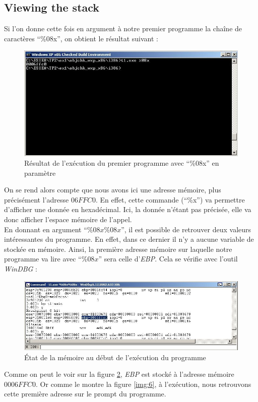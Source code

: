 \subsection{Viewing the stack}\label{stack}
Si l'on donne cette fois en argument à notre premier programme la chaîne de caractères \enquote{\%08x}, on obtient le résultat suivant :
\begin{figure}[H]
  \centering
  \includegraphics[width=.9\textwidth]{img/203.JPG}
  \caption{Résultat de l'exécution du premier programme avec \enquote{\%08x} en paramètre}
  \label{img:4}
\end{figure}
On se rend alors compte que nous avons ici une adresse mémoire, plus précisément l'adresse $06FFC0$. En effet, cette commande (\enquote{\%x}) va permettre d'afficher une donnée en hexadécimal. Ici, la donnée n'étant pas précisée, elle va donc afficher l'espace mémoire de l'appel.\\
En donnant en argument \enquote{$\%08x\%08x$}, il est possible de retrouver deux valeurs intéressantes du programme. En effet, dans ce dernier il n'y a aucune variable de stockée en mémoire. Ainsi, la première adresse mémoire sur laquelle notre programme va lire avec \enquote{$\%08x$} sera celle d'\textit{EBP}. Cela se vérifie avec l'outil \textit{WinDBG} :
\begin{figure}[H]
  \centering
  \includegraphics[width=.9\textwidth]{img/206.JPG}
  \caption{État de la mémoire au début de l'exécution du programme}
  \label{img:5}
\end{figure}
Comme on peut le voir sur la figure \ref{img:5}, \textit{EBP} est stocké à l'adresse mémoire $0006FFC0$. Or comme le montre la figure \ref{img:6}, à l'exécution, nous retrouvons cette première adresse sur le prompt du programme.
